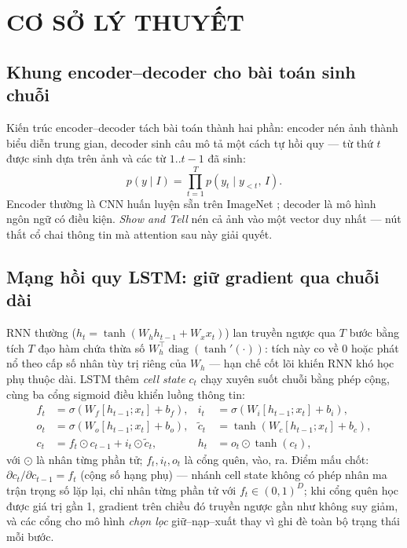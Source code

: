 \chapter{CƠ SỞ LÝ THUYẾT}
\label{chap:background}

\section{Khung encoder--decoder cho bài toán sinh chuỗi}

Kiến trúc encoder--decoder tách bài toán thành hai phần: encoder nén ảnh thành
biểu diễn trung gian, decoder sinh câu mô tả một cách tự hồi quy --- từ thứ $t$
được sinh dựa trên ảnh và các từ $1..t{-}1$ đã sinh:
\begin{equation}
	p(y \mid I) = \prod_{t=1}^{T} p\!\left(y_t \mid y_{<t},\, I\right).
\end{equation}
Encoder thường là CNN huấn luyện sẵn trên ImageNet \autocite{he2016resnet};
decoder là mô hình ngôn ngữ có điều kiện. \emph{Show and Tell}
\autocite{vinyals2015show} nén cả ảnh vào một vector duy nhất --- nút thắt cổ
chai thông tin mà attention sau này giải quyết.

\section{Mạng hồi quy LSTM: giữ gradient qua chuỗi dài}

RNN thường ($h_t = \tanh(W_h h_{t-1} + W_x x_t)$) lan truyền ngược qua $T$ bước
bằng tích $T$ đạo hàm chứa thừa số $W_h^\top \operatorname{diag}(\tanh'(\cdot))$:
tích này co về 0 hoặc phát nổ theo cấp số nhân tùy trị riêng của $W_h$ --- hạn
chế cốt lõi khiến RNN khó học phụ thuộc dài. LSTM \autocite{hochreiter1997lstm}
thêm \emph{cell state} $c_t$ chạy xuyên suốt chuỗi bằng phép cộng, cùng ba cổng
sigmoid điều khiển luồng thông tin:
\begin{align}
	f_t &= \sigma(W_f [h_{t-1}; x_t] + b_f), &
	i_t &= \sigma(W_i [h_{t-1}; x_t] + b_i), \\
	o_t &= \sigma(W_o [h_{t-1}; x_t] + b_o), &
	\tilde{c}_t &= \tanh(W_c [h_{t-1}; x_t] + b_c), \\
	c_t &= f_t \odot c_{t-1} + i_t \odot \tilde{c}_t, &
	h_t &= o_t \odot \tanh(c_t),
\end{align}
với $\odot$ là nhân từng phần tử; $f_t, i_t, o_t$ là cổng quên, vào, ra. Điểm
mấu chốt: $\partial c_t/\partial c_{t-1} = f_t$ (cộng số hạng phụ) --- nhánh
cell state không có phép nhân ma trận trọng số lặp lại, chỉ nhân từng phần tử
với $f_t \in (0,1)^D$; khi cổng quên học được giá trị gần 1, gradient trên
chiều đó truyền ngược gần như không suy giảm, và các cổng cho mô hình
\emph{chọn lọc} giữ--nạp--xuất thay vì ghi đè toàn bộ trạng thái mỗi bước.

